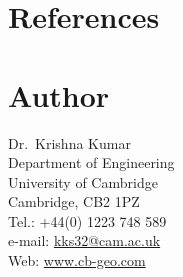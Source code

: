 \documentclass[12pt,twoside]{tuhhproc-en}
\begin{document}
\section*{References}
\printbibliography[heading=none]

\section*{Author}\small
Dr.\ Krishna Kumar\\
Department of Engineering \\
University of Cambridge \\
Cambridge, CB2 1PZ\\
Tel.: +44(0) 1223 748 589\\
e-mail: \url{kks32@cam.ac.uk}\\
Web: \url{www.cb-geo.com}\\
\end{document}
